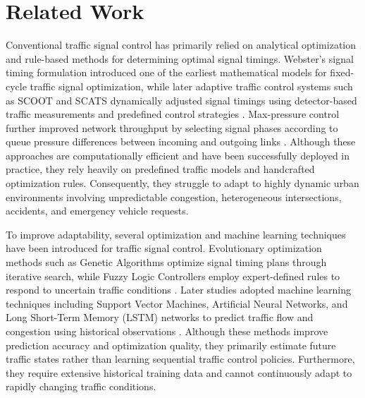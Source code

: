 \documentclass[3p,times]{elsarticle}
\theoremstyle{plain}
\theoremstyle{definition}
\begin{document}
\section{Related Work}\label{sec2}

Conventional traffic signal control has primarily relied on analytical
optimization and rule-based methods for determining optimal signal
timings. Webster's signal timing formulation introduced one of the
earliest mathematical models for fixed-cycle traffic signal
optimization, while later adaptive traffic control systems such as
SCOOT and SCATS dynamically adjusted signal timings using detector-based
traffic measurements and predefined control strategies
\cite{webster1958,scoot,scats,opac}. Max-pressure control further
improved network throughput by selecting signal phases according to
queue pressure differences between incoming and outgoing links
\cite{maxpressure}. Although these approaches are computationally
efficient and have been successfully deployed in practice, they rely
heavily on predefined traffic models and handcrafted optimization
rules. Consequently, they struggle to adapt to highly dynamic urban
environments involving unpredictable congestion, heterogeneous
intersections, accidents, and emergency vehicle requests.

To improve adaptability, several optimization and machine learning
techniques have been introduced for traffic signal control.
Evolutionary optimization methods such as Genetic Algorithms optimize
signal timing plans through iterative search, while Fuzzy Logic
Controllers employ expert-defined rules to respond to uncertain
traffic conditions \cite{genetic,fuzzy}. Later studies adopted machine
learning techniques including Support Vector Machines, Artificial
Neural Networks, and Long Short-Term Memory (LSTM) networks to predict
traffic flow and congestion using historical observations
\cite{anntraffic,svmtraffic,lstmtraffic}. Although these methods
improve prediction accuracy and optimization quality, they primarily
estimate future traffic states rather than learning sequential traffic
control policies. Furthermore, they require extensive historical
training data and cannot continuously adapt to rapidly changing
traffic conditions.
\end{document}
